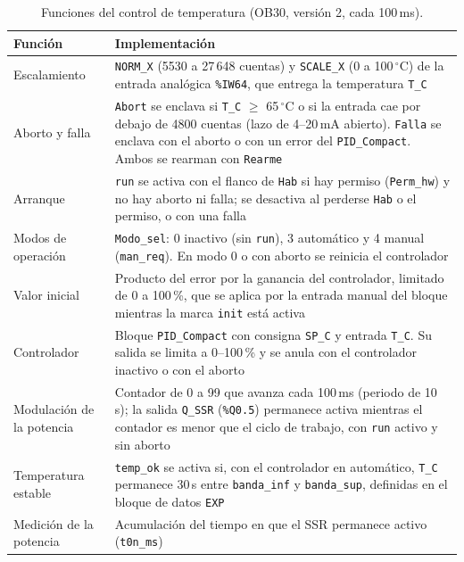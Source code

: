 \begin{table}[H]
\centering
\footnotesize
\caption{Funciones del control de temperatura (OB30, versión 2, cada 100\,ms).}
\label{tab:programa_control}
\begin{tabularx}{\textwidth}{L{2.6cm}Y}
\toprule
\textbf{Función} & \textbf{Implementación}\\
\midrule
Escalamiento & \texttt{NORM\_X} (5530 a 27\,648 cuentas) y \texttt{SCALE\_X} (0 a 100\,$^{\circ}$C) de la entrada analógica \texttt{\%IW64}, que entrega la temperatura \texttt{T\_C}\\
Aborto y falla & \texttt{Abort} se enclava si \texttt{T\_C} $\geq$ 65\,$^{\circ}$C o si la entrada cae por debajo de 4800 cuentas (lazo de 4--20\,mA abierto). \texttt{Falla} se enclava con el aborto o con un error del \texttt{PID\_Compact}. Ambos se rearman con \texttt{Rearme}\\
Arranque & \texttt{run} se activa con el flanco de \texttt{Hab} si hay permiso (\texttt{Perm\_hw}) y no hay aborto ni falla; se desactiva al perderse \texttt{Hab} o el permiso, o con una falla\\
Modos de operación & \texttt{Modo\_sel}: 0 inactivo (sin \texttt{run}), 3 automático y 4 manual (\texttt{man\_req}). En modo 0 o con aborto se reinicia el controlador\\
Valor inicial & Producto del error por la ganancia del controlador, limitado de 0 a 100\,\%, que se aplica por la entrada manual del bloque mientras la marca \texttt{init} está activa\\
Controlador & Bloque \texttt{PID\_Compact} con consigna \texttt{SP\_C} y entrada \texttt{T\_C}. Su salida se limita a 0--100\,\% y se anula con el controlador inactivo o con el aborto\\
Modulación de la potencia & Contador de 0 a 99 que avanza cada 100\,ms (periodo de 10\,s); la salida \texttt{Q\_SSR} (\texttt{\%Q0.5}) permanece activa mientras el contador es menor que el ciclo de trabajo, con \texttt{run} activo y sin aborto\\
Temperatura estable & \texttt{temp\_ok} se activa si, con el controlador en automático, \texttt{T\_C} permanece 30\,s entre \texttt{banda\_inf} y \texttt{banda\_sup}, definidas en el bloque de datos \texttt{EXP}\\
Medición de la potencia & Acumulación del tiempo en que el SSR permanece activo (\texttt{t0n\_ms})\\
\bottomrule
\end{tabularx}
\end{table}

